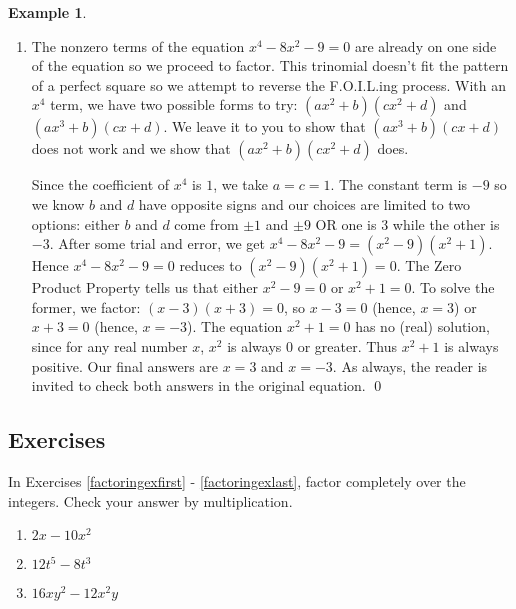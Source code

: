 \documentclass[11pt]{article}
\theoremstyle{definition}  %
\newtheorem{ex}{\bf Example}
\newcounter{HW}
\begin{document}
\begin{ex}
\begin{enumerate}
\item  The nonzero terms of the equation $x^4-8x^2 - 9= 0$ are already on one side of the equation so we proceed to factor.  This trinomial doesn't fit the pattern of a perfect square so we attempt to reverse the F.O.I.L.ing process.  With an $x^4$ term, we have two possible forms to try:  $(ax^2 + b)(cx^2 + d)$ and $(ax^3 + b)(cx +d)$.  We leave it to you to show that $(ax^3 + b)(cx +d)$ does not work and we show that  $(ax^2 + b)(cx^2 + d)$ does. 

\smallskip

Since the coefficient of $x^4$ is $1$, we take $a = c = 1$.  The constant term is $-9$ so we know $b$ and $d$ have opposite signs and our choices are limited to two options: either $b$ and $d$ come from $\pm 1$ and $\pm 9$ OR one is $3$ while the other is $-3$.  After some trial and error, we get $x^4 - 8x^2 - 9 = (x^2 - 9)(x^2+1)$.  Hence $x^4-8x^2 - 9= 0$ reduces to $(x^2 - 9)(x^2 + 1) = 0$.  The Zero Product Property tells us that either $x^2 - 9 = 0$ or $x^2+1 = 0$.  To solve the former, we factor: $(x-3)(x+3) = 0$, so $x-3 = 0$ (hence, $x = 3$) or $x+3 = 0$ (hence, $x = -3$).  The equation $x^2 + 1 = 0$ has no (real) solution, since for any real number $x$, $x^2$ is always $0$ or greater.  Thus $x^2 + 1$ is always positive.  Our final answers are $x = 3$ and $x = -3$. As always, the reader is invited to check both answers in the original equation. \qed

\end{enumerate}

\end{ex}

\newpage

\subsection{Exercises}

In Exercises \ref{factoringexfirst} - \ref{factoringexlast}, factor completely over the integers.  Check your answer by multiplication.

\begin{multicols}{3}
\begin{enumerate}

\item $2x - 10x^2$ \label{factoringexfirst}
\item $12t^5 - 8t^3$
\item $16xy^2 - 12x^2y$

\setcounter{HW}{\value{enumi}}
\end{enumerate}
\end{multicols}
\end{document}
